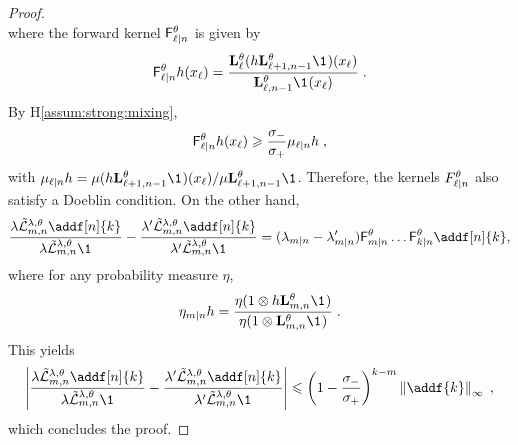 \documentclass{article}
\begin{document}
\begin{proof}
$$$$
where the forward kernel $ \mathsf{F}^\theta_{\ell|n}$ is given by
$$
 \mathsf{F}^\parvec_{\ell|n}h(x_\ell) = \frac{\uk{\ell}{\parvec}(h\uk{\ell+1, n-1}{\parvec}\1_{})(x_\ell)}{ \uk{\ell, n-1}{\parvec}\1_{}(x_\ell)}\eqsp.
$$
By H\ref{assum:strong:mixing}, 
$$
 \mathsf{F}^\theta_{\ell|n}h(x_\ell) \geqslant \frac{\sigma_-}{\sigma_+}\mu_{\ell|n}h\;,
$$
with $\mu_{\ell|n}h = \mu(h\uk{\ell+1, n-1}{\parvec}\1_{})(x_\ell) / \mu\uk{\ell+1, n-1}{\parvec}\1_{}$. Therefore, the kernels $ F^\theta_{\ell|n}$ also satisfy a Doeblin condition. On the other hand,
$$
\frac{\lambda\tilde{\mathcal{L}}^{\parvar,\parvec}_{m, n} \addf[n]{k}}{\lambda\tilde{\mathcal{L}}^{\parvar,\parvec}_{m, n} \1_{}} - \frac{\lambda'\tilde{\mathcal{L}}^{\parvar,\parvec}_{m, n} \addf[n]{k}}{\lambda'\tilde{\mathcal{L}}^{\parvar,\parvec}_{m, n} \1_{}} = (\lambda_{m|n} - \lambda'_{m|n})\mathsf{F}^\parvec_{m|n}\ldots \mathsf{F}^\parvec_{k|n}\addf[n]{k},
$$
where for any probability measure $\eta$,
$$
\eta_{m|n}h = \frac{\eta(1\otimes h\uk{m, n}{\parvec}\1_{})}{\eta(1\otimes \uk{m, n}{\parvec}\1_{})}\eqsp.
$$
This yields
$$
\left|\frac{\lambda\tilde{\mathcal{L}}^{\parvar,\parvec}_{m, n} \addf[n]{k}}{\lambda\tilde{\mathcal{L}}^{\parvar,\parvec}_{m, n} \1_{}} - \frac{\lambda'\tilde{\mathcal{L}}^{\parvar,\parvec}_{m, n} \addf[n]{k}}{\lambda'\tilde{\mathcal{L}}^{\parvar,\parvec}_{m, n} \1_{}}\right|\leqslant  \left(1-\frac{\sigma_-}{\sigma_+}\right)^{k-m}\left\|\addf{k}\right\|_\infty\eqsp,
$$
which concludes the proof.
 
\end{proof}
\end{document}
